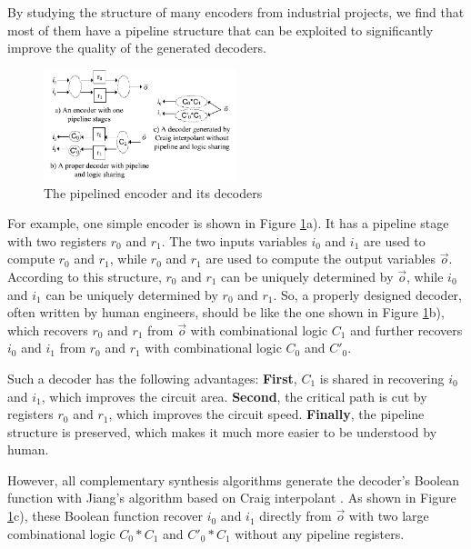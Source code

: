 \documentclass[twocolumn]{article}
\begin{document}
By studying the structure of many encoders from industrial projects,
we find that most of them have a pipeline structure that can be exploited to
significantly improve the quality of the generated decoders.

\begin{figure}[t]
\begin{center}
\includegraphics[width=0.5\textwidth]{pipeline}
\end{center}
\caption{The pipelined encoder and its decoders}
  \label{fig_pipe}
\end{figure}

For example,
one simple encoder is shown in Figure \ref{fig_pipe}a).
It has a pipeline stage with two registers $r_0$ and $r_1$.
The two inputs variables $i_0$ and $i_1$ are used to compute $r_0$ and $r_1$,
while $r_0$ and $r_1$ are used to compute the output variables $\vec{o}$.
According to this structure,
$r_0$ and $r_1$ can be uniquely determined by $\vec{o}$,
while $i_0$ and $i_1$ can be uniquely determined by $r_0$ and $r_1$.
So,
a properly designed decoder,
often written by human engineers,
should be like the one shown in Figure \ref{fig_pipe}b),
which recovers $r_0$ and $r_1$ from $\vec{o}$ with combinational logic $C_1$
and further recovers $i_0$ and $i_1$ from $r_0$ and $r_1$ with combinational logic $C_0$ and $C'_0$.

Such a decoder has the following advantages:
 \textbf{First},
 $C_1$ is shared in recovering $i_0$ and $i_1$,
 which improves the circuit area.
 \textbf{Second},
 the critical path is cut by registers $r_0$ and $r_1$, 
 which improves the circuit speed.
 \textbf{Finally},
 the pipeline structure is preserved,
 which makes it much more easier to be understood by human.

However,
all complementary synthesis algorithms \cite{ShenTCAD10,ShenTCAD11,ShenTCAD12,LiuICCAD11,LiuTCAD12,TuDAC13}
generate the decoder's Boolean function with Jiang's algorithm \cite{InterpBoolFunction} 
based on Craig interpolant \cite{Craig}.
As shown in Figure \ref{fig_pipe}c),
these Boolean function recover $i_0$ and $i_1$ directly from $\vec{o}$ 
with two large combinational logic $C_0*C_1$ and $C'_0*C_1$
without any pipeline registers.
\end{document}
